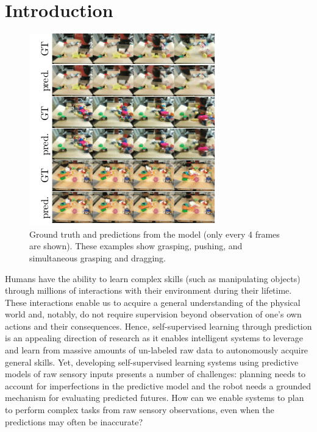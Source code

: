 \section{Introduction}

\begin{figure}
\vspace{-5mm}
\centering
\includegraphics[width=0.4\columnwidth,trim={3.2mm 0 0 0},clip]{images/video_prediction}
\caption{\small{Ground truth and predictions from the model (only every 4 frames are shown). These examples show grasping, pushing, and simultaneous grasping and dragging. }}
\label{fig:video_prediction}
\vspace{-0.2in}
\end{figure}

Humans have the ability to learn complex skills (such as manipulating objects) through millions of interactions with their environment during their lifetime.
These interactions enable us to acquire a general understanding of the physical world and, notably, do not require supervision beyond observation of one's own actions and their consequences. Hence, self-supervised learning through prediction is an appealing direction of research as it enables intelligent systems to leverage and learn from massive amounts of un-labeled raw data to autonomously acquire general skills. Yet, developing self-supervised learning systems using predictive models of raw sensory inputs presents a number of challenges: planning needs to account for imperfections in the predictive model and the robot needs a grounded mechanism for evaluating predicted futures.
How can we enable systems to plan to perform complex tasks from raw sensory observations, even when the predictions may often be inaccurate?

